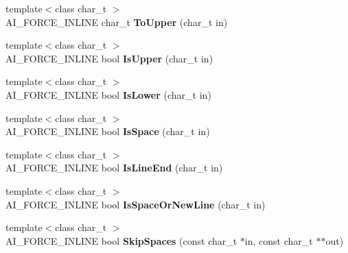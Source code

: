 \begin{DoxyCompactItemize}
\item 
\hypertarget{namespace_assimp_ae962b1f79ef7c286cfa1ba76b557f1b3}{{\footnotesize template$<$class char\+\_\+t $>$ }\\A\+I\+\_\+\+F\+O\+R\+C\+E\+\_\+\+I\+N\+L\+I\+N\+E char\+\_\+t {\bfseries To\+Upper} (char\+\_\+t in)}\label{namespace_assimp_ae962b1f79ef7c286cfa1ba76b557f1b3}

\item 
\hypertarget{namespace_assimp_a704d02684243c28d97f16184ca7da160}{{\footnotesize template$<$class char\+\_\+t $>$ }\\A\+I\+\_\+\+F\+O\+R\+C\+E\+\_\+\+I\+N\+L\+I\+N\+E bool {\bfseries Is\+Upper} (char\+\_\+t in)}\label{namespace_assimp_a704d02684243c28d97f16184ca7da160}

\item 
\hypertarget{namespace_assimp_a9b1362fc8d49819d06aae521117255aa}{{\footnotesize template$<$class char\+\_\+t $>$ }\\A\+I\+\_\+\+F\+O\+R\+C\+E\+\_\+\+I\+N\+L\+I\+N\+E bool {\bfseries Is\+Lower} (char\+\_\+t in)}\label{namespace_assimp_a9b1362fc8d49819d06aae521117255aa}

\item 
\hypertarget{namespace_assimp_a2dc3cfed4430c305908c17c403ced49c}{{\footnotesize template$<$class char\+\_\+t $>$ }\\A\+I\+\_\+\+F\+O\+R\+C\+E\+\_\+\+I\+N\+L\+I\+N\+E bool {\bfseries Is\+Space} (char\+\_\+t in)}\label{namespace_assimp_a2dc3cfed4430c305908c17c403ced49c}

\item 
\hypertarget{namespace_assimp_a99092e9b63e3e8bb88dc63e141d7157f}{{\footnotesize template$<$class char\+\_\+t $>$ }\\A\+I\+\_\+\+F\+O\+R\+C\+E\+\_\+\+I\+N\+L\+I\+N\+E bool {\bfseries Is\+Line\+End} (char\+\_\+t in)}\label{namespace_assimp_a99092e9b63e3e8bb88dc63e141d7157f}

\item 
\hypertarget{namespace_assimp_a3883df5611e6ba0bd986fd5694c47e35}{{\footnotesize template$<$class char\+\_\+t $>$ }\\A\+I\+\_\+\+F\+O\+R\+C\+E\+\_\+\+I\+N\+L\+I\+N\+E bool {\bfseries Is\+Space\+Or\+New\+Line} (char\+\_\+t in)}\label{namespace_assimp_a3883df5611e6ba0bd986fd5694c47e35}

\item 
\hypertarget{namespace_assimp_a0c02640871537ab3d13415909863c27f}{{\footnotesize template$<$class char\+\_\+t $>$ }\\A\+I\+\_\+\+F\+O\+R\+C\+E\+\_\+\+I\+N\+L\+I\+N\+E bool {\bfseries Skip\+Spaces} (const char\+\_\+t $\ast$in, const char\+\_\+t $\ast$$\ast$out)}\label{namespace_assimp_a0c02640871537ab3d13415909863c27f}


\end{DoxyCompactItemize}
